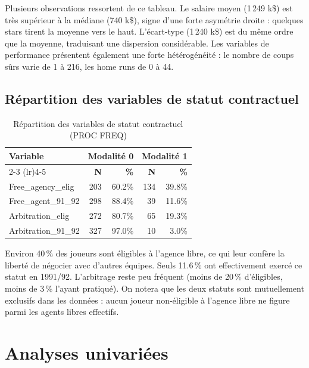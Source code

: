 \documentclass[11pt,a4paper]{article}
\begin{document}
Plusieurs observations ressortent de ce tableau. Le salaire moyen (1\,249 k\$) est
très supérieur à la médiane (740 k\$), signe d'une forte asymétrie droite : quelques
stars tirent la moyenne vers le haut. L'écart-type (1\,240 k\$) est du même ordre
que la moyenne, traduisant une dispersion considérable. Les variables de performance
présentent également une forte hétérogénéité : le nombre de coups sûrs varie de 1 à
216, les home runs de 0 à 44.

\subsection{Répartition des variables de statut contractuel}

\begin{table}[H]
\centering
\caption{Répartition des variables de statut contractuel (PROC FREQ)}
\label{tab:freq}
\begin{tabular}{lrrrr}
\toprule
\multirow{2}{*}{\textbf{Variable}} & \multicolumn{2}{c}{\textbf{Modalité 0}} & \multicolumn{2}{c}{\textbf{Modalité 1}} \\
\cmidrule(lr){2-3} \cmidrule(lr){4-5}
 & \textbf{N} & \textbf{\%} & \textbf{N} & \textbf{\%} \\
\midrule
Free\_agency\_elig    & 203 & 60.2\% & 134 & 39.8\% \\
Free\_agent\_91\_92   & 298 & 88.4\% & 39  & 11.6\% \\
Arbitration\_elig     & 272 & 80.7\% & 65  & 19.3\% \\
Arbitration\_91\_92   & 327 & 97.0\% & 10  & 3.0\%  \\
\bottomrule
\end{tabular}
\end{table}

Environ 40\,\% des joueurs sont éligibles à l'agence libre, ce qui leur confère la
liberté de négocier avec d'autres équipes. Seuls 11.6\,\% ont effectivement exercé ce
statut en 1991/92. L'arbitrage reste peu fréquent (moins de 20\,\% d'éligibles, moins
de 3\,\% l'ayant pratiqué). On notera que les deux statuts sont mutuellement exclusifs
dans les données : aucun joueur non-éligible à l'agence libre ne figure parmi les
agents libres effectifs.

\section{Analyses univariées}
\end{document}
